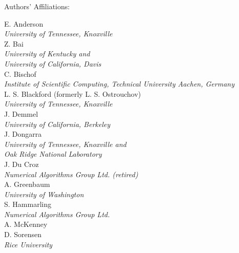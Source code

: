 \documentclass[11pt,twoside]{report}
\begin{document}
\newpage
\begin{center}
\Large
Authors' Affiliations:
\end{center}
\vspace{0.15in}
\begin{center}
\large
E. Anderson \\
{\it University of Tennessee, Knoxville} \\
\vspace{0.15in}
Z. Bai \\
{\it University of Kentucky and \\ 
University of California, Davis} \\
\vspace{0.15in}
C. Bischof \\
{\it Institute of Scientific Computing, Technical University Aachen, Germany} \\ 
\vspace{0.15in}
L. S. Blackford (formerly L. S. Ostrouchov)\\
{\it University of Tennessee, Knoxville} \\ 
\vspace{0.15in}
J. Demmel \\
{\it University of California, Berkeley} \\ 
\vspace{0.15in}
J. Dongarra \\
{\it University of Tennessee, Knoxville and \\ 
Oak Ridge National Laboratory} \\
\vspace{0.15in}
J. Du Croz \\
{\it Numerical Algorithms Group Ltd. (retired)} \\ 
\vspace{0.15in}
A. Greenbaum \\
{\it University of Washington} \\ 
\vspace{0.15in}
S. Hammarling \\
{\it Numerical Algorithms Group Ltd.} \\ 
\vspace{0.15in}
A. McKenney \\
\vspace{0.15in}
D. Sorensen \\
{\it Rice University} \\
\end{center}
\newpage
\end{document}

